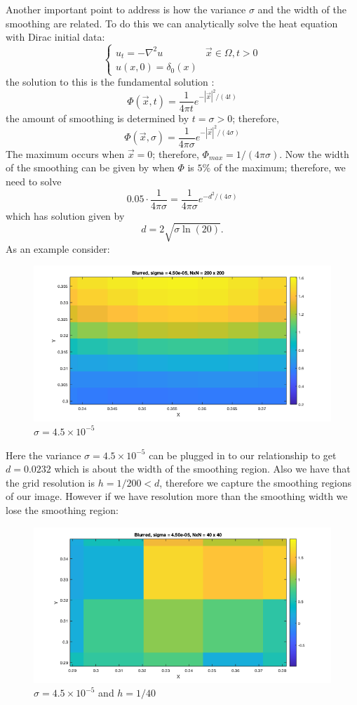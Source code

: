 \documentclass[margin=1in,12pt,3p]{elsarticle}
\begin{document}
Another important point to address is how the variance $\sigma$ and the width of the smoothing are related. To do this we can analytically solve the heat equation with Dirac initial data:
\[
\begin{cases}
u_t = -\nabla^2u & \vec{x}\in\Omega, t>0\\
u(x,0)= \delta_0(x)
\end{cases}
\]
the solution to this is the fundamental solution \cite{evans2010partial}:
\[
\Phi(\vec{x},t)=\frac{1}{4\pi t}e^{-|\vec{x}|^2/(4t)}
\]
the amount of smoothing is determined by $t=\sigma>0$; therefore,
\[
\Phi(\vec{x},\sigma)=\frac{1}{4\pi \sigma}e^{-|\vec{x}|^2/(4\sigma)}
\]
The maximum occurs when $\vec{x}=0$; therefore, $\Phi_{max}=1/(4\pi \sigma)$. Now the width of the smoothing can be given by when $\Phi$ is $5\%$ of the maximum; therefore, we need to solve
\[
0.05\cdot\frac{1}{4\pi\sigma}=\frac{1}{4\pi \sigma}e^{-d^2/(4\sigma)}
\]
which has solution given by
\[
d = 2\sqrt{\sigma\ln(20)}.
\]
\clearpage
As an example consider:
\begin{figure}[h!]
    \centering
    \includegraphics[width = 0.6\linewidth]{blurrEX.png}
    \caption{$\sigma=4.5\times 10^{-5}$}
\end{figure}

Here the variance $\sigma = 4.5\times 10^{-5}$ can be plugged in to our relationship to get $d = 0.0232$ which is about the width of the smoothing region. Also we have that the grid resolution is $h=1/200<d$, therefore we capture the smoothing regions of our image. However if we have resolution more than the smoothing width we lose the smoothing region:
\begin{figure}[h!]
    \centering
    \includegraphics[width = 0.6\linewidth]{blurrEX2.png}
    \caption{$\sigma=4.5\times 10^{-5}$ and $h=1/40$}
\end{figure}
\end{document}
